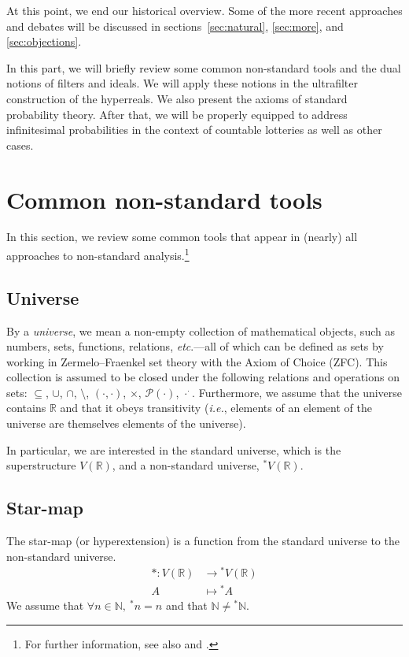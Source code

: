 At this point, we end our historical overview. Some of the more recent approaches and debates will be discussed in sections~\ref{sec:natural}, \ref{sec:more}, and \ref{sec:objections}.

\newpage
{}
In this part, we will briefly review some common non-standard tools and the dual notions of filters and ideals. We will apply these notions in the ultrafilter construction of the hyperreals. We also present the axioms of standard probability theory. After that, we will be properly equipped to address infinitesimal probabilities in the context of countable lotteries as well as other cases.

\section{Common non-standard tools}\label{sec:commonNStools}

In this section, we review some common tools that appear in (nearly) all approaches to non-standard analysis.\footnote{For further information, see also \citet[section~1]{Benci_etal:2006a} and \citet[section~1.2]{Cutland:1983}.}

\subsection{Universe}
By a \textit{universe}, we mean a non-empty collection of mathematical objects, such as numbers, sets, functions, relations, \textit{etc}.---all of which can be defined as sets by working in Zermelo--Fraenkel set theory with the Axiom of Choice (ZFC). This collection is assumed to be closed under the following relations and operations on sets: $\subseteq$, $\cup$, $\cap$, $\setminus$, $(\cdot,\cdot)$, $\times$, $\mathcal{P}(\cdot)$, $\cdot^\cdot$.
Furthermore, we assume that the universe contains $\mathbb{R}$ and that it obeys transitivity (\textit{i.e.}, elements of an element of the universe are themselves elements of the universe).

In particular, we are interested in the standard universe, which is the superstructure $V(\mathbb{R})$, and a non-standard universe, ${^\ast V}(\mathbb{R})$.

\subsection{Star-map}
The star-map (or hyperextension) is a function from the standard universe to the non-standard universe.
$$
\begin{aligned}
\ast : V(\mathbb{R}) &\rightarrow {^\ast V}(\mathbb{R})\\
	    A &\mapsto {^\ast A}
\end{aligned}
$$
We assume that $\forall n \in \mathbb{N}, \ {^\ast n}=n$ and that $\mathbb{N} \neq {^\ast \mathbb{N}}$.

